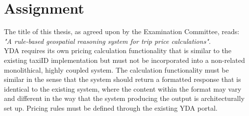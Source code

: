 %
\section{Assignment}
The title of this thesis, as agreed upon by the Examination Committee, reads: \\
\textit{"A rule-based geospatial reasoning system for trip price calculations"}. \\

YDA requires its own pricing calculation functionality that is similar to the existing taxiID implementation but must not be incorporated into a non-related monolithical, highly coupled system. The calculation functionality must be similar in the sense that the system should return a formatted response that is identical to the existing system, where the content within the format may vary and different in the way that the system producing the output is architecturally set up. Pricing rules must be defined through the existing YDA portal.




